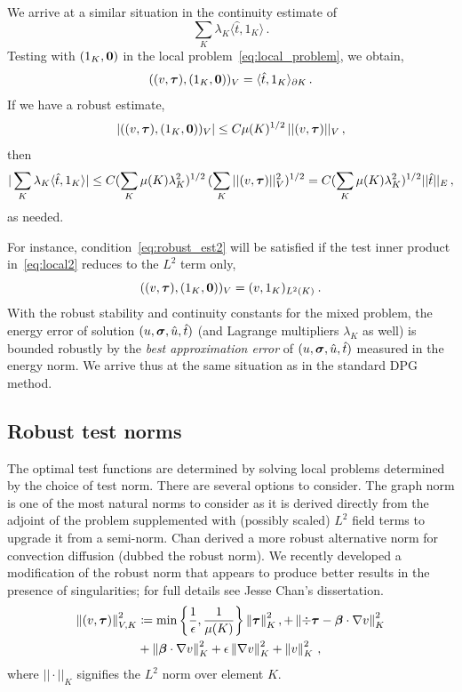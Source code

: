 \documentclass[Proposal.tex]{subfiles}
\begin{document}
We arrive at a similar situation in the continuity estimate of
$$
\sum_K \lambda_K \langle \hat{t}, 1_K \rangle\,.
$$
Testing with $(1_K,{\bf 0})$ in the local problem~\eqref{eq:local_problem}, we obtain,
\begin{equation}
((v,\boldsymbol\tau),(1_K,{\bf 0}))_V = \langle \hat{t}, 1_K \rangle_{\partial K}\,.
\label{eq:local2}
\end{equation}
If we have a robust estimate,
\begin{equation}
| ((v,\boldsymbol\tau),(1_K,{\bf 0}))_V | \leq C \mu(K)^{1/2} \, || (v,\boldsymbol\tau) ||_V\,,
\label{eq:robust_est2}
\end{equation}
then
\begin{equation}
| \sum_K \lambda_K \langle \hat{t}, 1_K \rangle | \leq C (\sum_K \mu(K) \lambda_K^2)^{1/2}
\, (\sum_K || (v,\boldsymbol\tau) ||_V^2)^{1/2}
= C (\sum_K \mu(K) \lambda_K^2)^{1/2}  || \hat{t} ||_E\,,
\end{equation}
as needed.

For instance, condition~\eqref{eq:robust_est2} will be satisfied if the test inner product
in~\eqref{eq:local2} reduces to the $L^2$ term only,
\begin{equation}
((v,\boldsymbol\tau),(1_K,{\bf 0}))_V = (v,1_K)_{L^2(K)} \: .
\end{equation}
With the robust stability and continuity constants for the mixed problem, the energy error
of solution $(u,\boldsymbol\sigma,\hat{u},\hat{t})$ (and Lagrange multipliers $\lambda_K$ as well)
is bounded robustly by the {\em best approximation error} of  $(u,\boldsymbol\sigma,\hat{u},\hat{t})$
measured in the energy norm. We arrive thus at the same situation as in the standard
DPG method.

\subsection{Robust test norms}
\label{sec:robustNorms}
The optimal test functions are determined by solving local problems determined
by the choice of test norm. There are several options to consider.
The graph norm \cite{DPGOverview} is one of the most natural norms to consider
as it is derived directly from the adjoint of the problem supplemented with
(possibly scaled) $L^2$ field terms to upgrade it from a semi-norm.
Chan \etal\cite{ChanHeuerThanhDemkowicz2012} derived a more robust alternative
norm for convection diffusion (dubbed the robust norm). We recently
developed a modification of the robust norm that appears to produce better
results in the presence of singularities; 
for full details see Jesse Chan's dissertation\cite{JesseDissertation}.
\begin{align}
\left\| \left( v,\boldsymbol\tau \right) \right\|_{V,K}^2 &\coloneqq
\min\left\{\frac{1}{\epsilon},\frac{1}{\mu(K)}\right\}\left\| \boldsymbol\tau \right\|_K^2,
+ \left\| \div \boldsymbol\tau - \boldsymbol\beta\cdot\nabla v \right\|_K^2 \\
&+\left\| \boldsymbol\beta\cdot \nabla v \right\|_K^2
+ \epsilon\left\| \nabla v \right\|_K^2
+ \left\| v \right\|^2_K\,,
\end{align}
where $||\cdot||_K$ signifies the $L^2$ norm over element $K$.\
\end{document}
